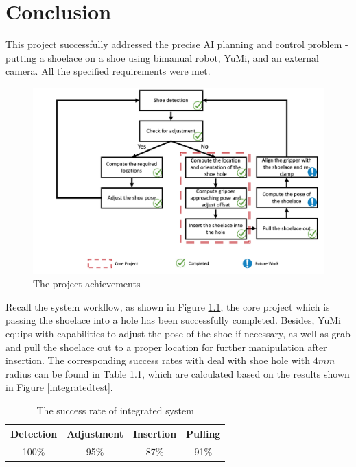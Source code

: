 \chapter{Conclusion}

This project successfully addressed the precise AI planning and control problem - putting a shoelace on a shoe using bimanual robot, YuMi, and an external camera. All the specified requirements were met.

\begin{figure}[H]
\centering
\includegraphics[width = \columnwidth]{conclusion/workflowcon.png}
\caption{The project achievements}
\label{workflowcon}
\end{figure}

Recall the system workflow, as shown in Figure \ref{workflowcon}, the core project which is passing the shoelace into a hole has been successfully completed. Besides, YuMi equips with capabilities to adjust the pose of the shoe if necessary, as well as grab and pull the shoelace out to a proper location for further manipulation after insertion. The corresponding success rates with deal with shoe hole with $4mm$ radius can be found in Table \ref{sris}, which are calculated based on the results shown in Figure \ref{integratedtest}.

\begin{table}[H]
\centering
\begin{tabular}{||c|c|c|c||}
\hline
Detection & Adjustment & Insertion & Pulling \\ \hline\hline
100\% & 95\% & 87\% & 91\% \\ \hline
\end{tabular}
\caption{The success rate of integrated system}
\label{sris}
\end{table}

